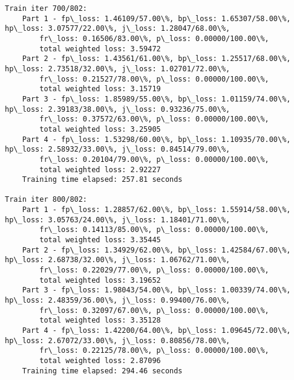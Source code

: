 \documentclass[11pt]{article}
\begin{document}
\begin{Verbatim}[commandchars=\\\{\}]
Train iter 700/802:
	Part 1 - fp\_loss: 1.46109/57.00\%, bp\_loss: 1.65307/58.00\%, hp\_loss: 3.07577/22.00\%, j\_loss: 1.28047/68.00\%, 
		fr\_loss: 0.16506/83.00\%, p\_loss: 0.00000/100.00\%, 
		total weighted loss: 3.59472
	Part 2 - fp\_loss: 1.43561/61.00\%, bp\_loss: 1.25517/68.00\%, hp\_loss: 2.73518/32.00\%, j\_loss: 1.02701/72.00\%, 
		fr\_loss: 0.21527/78.00\%, p\_loss: 0.00000/100.00\%, 
		total weighted loss: 3.15719
	Part 3 - fp\_loss: 1.85989/55.00\%, bp\_loss: 1.01159/74.00\%, hp\_loss: 2.39183/38.00\%, j\_loss: 0.93236/75.00\%, 
		fr\_loss: 0.37572/63.00\%, p\_loss: 0.00000/100.00\%, 
		total weighted loss: 3.25905
	Part 4 - fp\_loss: 1.53298/60.00\%, bp\_loss: 1.10935/70.00\%, hp\_loss: 2.58932/33.00\%, j\_loss: 0.84514/79.00\%, 
		fr\_loss: 0.20104/79.00\%, p\_loss: 0.00000/100.00\%, 
		total weighted loss: 2.92227
	Training time elapsed: 257.81 seconds

Train iter 800/802:
	Part 1 - fp\_loss: 1.28857/62.00\%, bp\_loss: 1.55914/58.00\%, hp\_loss: 3.05763/24.00\%, j\_loss: 1.18401/71.00\%, 
		fr\_loss: 0.14113/85.00\%, p\_loss: 0.00000/100.00\%, 
		total weighted loss: 3.35445
	Part 2 - fp\_loss: 1.34929/62.00\%, bp\_loss: 1.42584/67.00\%, hp\_loss: 2.68738/32.00\%, j\_loss: 1.06762/71.00\%, 
		fr\_loss: 0.22029/77.00\%, p\_loss: 0.00000/100.00\%, 
		total weighted loss: 3.19652
	Part 3 - fp\_loss: 1.98043/54.00\%, bp\_loss: 1.00339/74.00\%, hp\_loss: 2.48359/36.00\%, j\_loss: 0.99400/76.00\%, 
		fr\_loss: 0.32097/67.00\%, p\_loss: 0.00000/100.00\%, 
		total weighted loss: 3.35128
	Part 4 - fp\_loss: 1.42200/64.00\%, bp\_loss: 1.09645/72.00\%, hp\_loss: 2.67072/33.00\%, j\_loss: 0.80856/78.00\%, 
		fr\_loss: 0.22125/78.00\%, p\_loss: 0.00000/100.00\%, 
		total weighted loss: 2.87096
	Training time elapsed: 294.46 seconds


\end{Verbatim}
\end{document}
